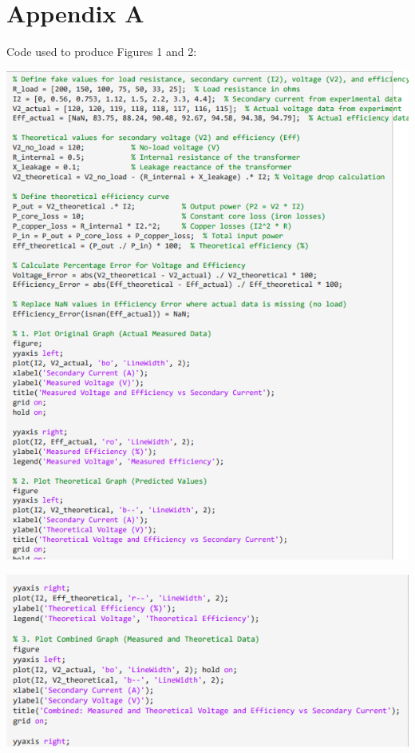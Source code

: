 \documentclass[11pt]{article}
\begin{document}
\section{Appendix A}
\label{sec:org3b99799}
Code used to produce Figures 1 and 2:
\begin{center}
\includegraphics[width=.9\linewidth]{Code1.png}
\end{center}
\begin{center}
\includegraphics[width=.9\linewidth]{Code2.png}
\end{center}
\end{document}

